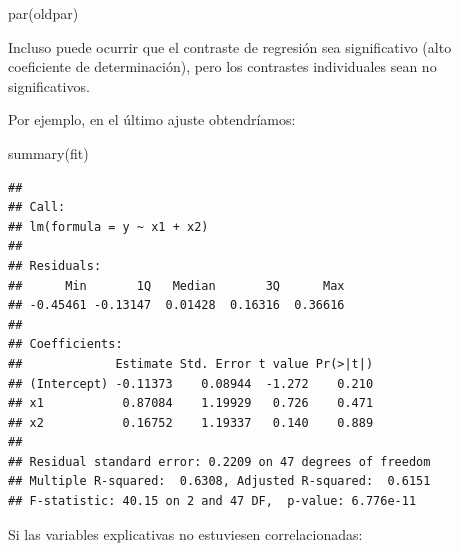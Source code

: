 \documentclass[
]{book}
\newenvironment{Shaded}{\begin{snugshade}}{\end{snugshade}}
\newcommand{\FunctionTok}[1]{\textcolor[rgb]{0.00,0.00,0.00}{#1}}
\newcommand{\NormalTok}[1]{#1}
\theoremstyle{break}
\theoremstyle{definition}
\theoremstyle{definition}
\theoremstyle{definition}
\theoremstyle{definition}
\theoremstyle{remark}
\begin{document}
\begin{Shaded}
\begin{Highlighting}[]
\FunctionTok{par}\NormalTok{(oldpar)}
\end{Highlighting}
\end{Shaded}

Incluso puede ocurrir que el contraste de regresión sea significativo (alto coeficiente de determinación), pero los contrastes individuales sean no significativos.

Por ejemplo, en el último ajuste obtendríamos:

\begin{Shaded}
\begin{Highlighting}[]
\FunctionTok{summary}\NormalTok{(fit)}
\end{Highlighting}
\end{Shaded}

\begin{verbatim}
## 
## Call:
## lm(formula = y ~ x1 + x2)
## 
## Residuals:
##      Min       1Q   Median       3Q      Max 
## -0.45461 -0.13147  0.01428  0.16316  0.36616 
## 
## Coefficients:
##             Estimate Std. Error t value Pr(>|t|)
## (Intercept) -0.11373    0.08944  -1.272    0.210
## x1           0.87084    1.19929   0.726    0.471
## x2           0.16752    1.19337   0.140    0.889
## 
## Residual standard error: 0.2209 on 47 degrees of freedom
## Multiple R-squared:  0.6308, Adjusted R-squared:  0.6151 
## F-statistic: 40.15 on 2 and 47 DF,  p-value: 6.776e-11
\end{verbatim}

Si las variables explicativas no estuviesen correlacionadas:
\end{document}
